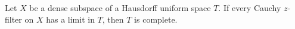 Let $X$ be a dense subspace of a Hausdorff uniform space $T$. If every Cauchy $z$-filter on $X$ has a limit in $T$, then $T$ is complete.

